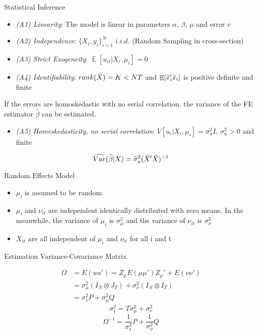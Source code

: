 \documentclass[11pt]{beamer}
\begin{document}
\begin{frame}
Statistical Inference

\begin{itemize}
    \item \textit{(A1) Linearity}: The model is linear in parameters $\alpha$, $\beta$, $\mu$ and error $v$
    \item \textit{(A2) Independence}: $\{ X_i, y_i \}_{i=1}^N \; i.i.d.$ (Random Sampling in cross-section)
    \item \textit{(A3) Strict Exogeneity}: $\mathop{\mathbb{E}}[u_{it}|X_i, \mu_i]=0$
    \item \textit{(A4) Identifiability}: $rank(\Tilde{X})=K<NT$ and $\mathop{\mathbb{E}}[\Tilde{x}_i'\Tilde{x}_i]$ is positive definite and finite
\end{itemize}
If the errors are homoskedastic with no serial correlation, the variance of the FE estimator $\hat{\beta}$ can be estimated.
\begin{itemize}
    \item \textit{(A5) Homeskedasticity, no serial correlation}: $V[u_i|X_i, \mu_i]=\sigma_u^2I,\,\sigma_u^2>0$ and finite
\end{itemize}
\begin{equation}
    \widehat{Var}(\widehat{\beta}|X)=\widehat{\sigma}_u^2(\Tilde{X}'\Tilde{X})^{-1}
\end{equation}
\end{frame}

\begin{frame}
Random Effects Model

\begin{itemize}
    \item $\mu_i$ is assumed to be random
    \item $\mu_i$ and $\nu_{it}$ are independent identically distributed with zero means. In the meanwhile, the variance of $\mu_i$ is $\sigma_\mu ^2$ and the variance of $\nu_{it}$ is $\sigma_\nu ^2$
    \item $X_{it}$ are all independent of $\mu_i$ and $\nu_{it}$ for all i and t
\end{itemize}
\end{frame}

\begin{frame}
Estimation
   Variance-Covariance Matrix

    \begin{equation}
    \begin{split}
    \Omega &= E(uu') = Z_\mu E(\mu \mu')Z_\mu' + E(\nu\nu')\\
    &= \sigma_\mu^2(I_N \otimes J_T) + \sigma_\nu^2(I_N \otimes I_T)\\
    &= \sigma_1^2P + \sigma_\mu^2Q
    \end{split}
    \end{equation}
    \begin{equation}
    \sigma_1^2 = T\sigma_\mu^2 + \sigma_\nu^2
    \end{equation}
    \begin{equation}
    \Omega^{-1} = \frac{1}{\sigma_1^2} P + \frac{1}{\sigma_\nu^2} Q
    \end{equation}
\end{frame}
\end{document}
